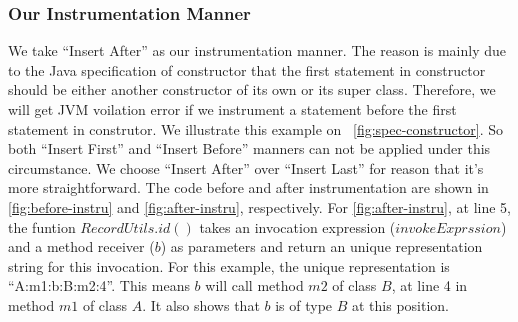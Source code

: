 \documentclass{fac}
\begin{document}
\subsubsection{Our Instrumentation Manner}\label{subsubsec:instrument}
We take ``Insert After'' as our instrumentation manner. The reason is mainly due to the Java specification of constructor that the first statement in constructor should be either another constructor of its own or its super class. Therefore, we will get JVM voilation error if we instrument a statement before the first statement in construtor. We illustrate this example on ~\ref{fig:spec-constructor}. So both ``Insert First'' and ``Insert Before'' manners can not be applied under this circumstance. We choose ``Insert After'' over ``Insert Last'' for reason that it's more straightforward. The code before and after instrumentation are shown in \ref{fig:before-instru} and \ref{fig:after-instru}, respectively. For \ref{fig:after-instru}, at line 5, the funtion $RecordUtils.id()$ takes an invocation expression ($invokeExprssion$) and a method receiver ($b$) as parameters and return an unique representation string for this invocation. For this example, the unique representation is ``A:m1:b:B:m2:4''. This means $b$ will call method $m2$ of class $B$, at line 4 in method $m1$ of class $A$. It also shows that $b$ is of type $B$ at this position.
\end{document}
